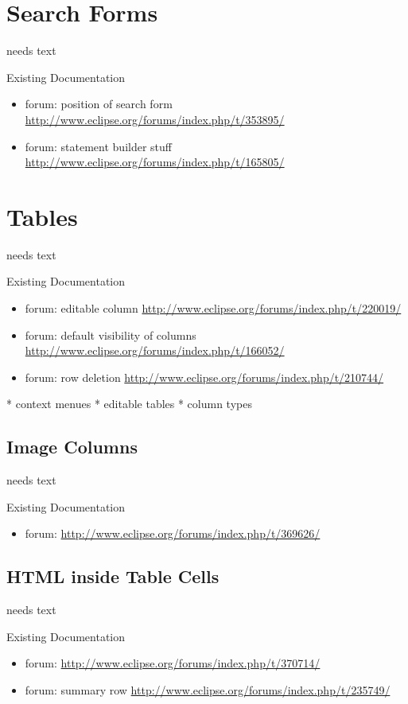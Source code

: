 \documentclass[a4paper,10pt,twoside]{book}
\begin{document}
	
\section{Search Forms}
needs text

\noindent Existing Documentation
\begin{itemize}
  \item forum: position of search form \url{http://www.eclipse.org/forums/index.php/t/353895/}
  \item forum: statement builder stuff \url{http://www.eclipse.org/forums/index.php/t/165805/}
\end{itemize}
	
\section{Tables}
needs text

\noindent Existing Documentation
\begin{itemize}
  \item forum: editable column \url{http://www.eclipse.org/forums/index.php/t/220019/}
  \item forum: default visibility of columns \url{http://www.eclipse.org/forums/index.php/t/166052/}
  \item forum: row deletion \url{http://www.eclipse.org/forums/index.php/t/210744/}
\end{itemize}

	* context menues
	* editable tables
    * column types

\subsection{Image Columns}
needs text

\noindent Existing Documentation
\begin{itemize}
  \item forum: \url{http://www.eclipse.org/forums/index.php/t/369626/}
\end{itemize}

\subsection{HTML inside Table Cells}
needs text

\noindent Existing Documentation
\begin{itemize}
  \item forum: \url{http://www.eclipse.org/forums/index.php/t/370714/}
  \item forum: summary row \url{http://www.eclipse.org/forums/index.php/t/235749/}
\end{itemize}
\end{document}
